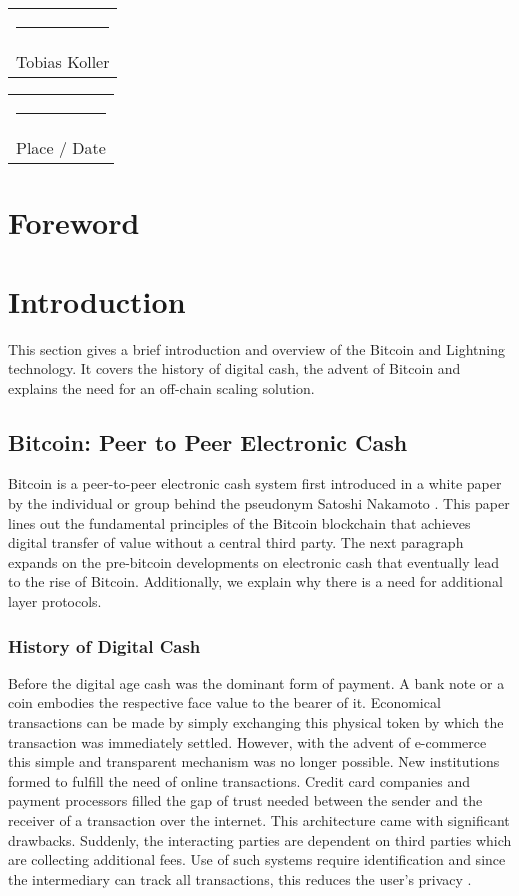 \documentclass[final]{fhnwreport}       %
\begin{document}
\vspace*{4em}\noindent
\hfill%
\begin{tabular}[t]{c}
  \rule{10em}{0.4pt}\\Tobias Koller 
\end{tabular}%
\hfill%
\begin{tabular}[t]{c}
  \rule{10em}{0.4pt}\\ Place / Date
\end{tabular}%
\hfill\strut
\clearpage

\section*{Foreword}
\clearpage

\clearpage


\section{Introduction} 
This section gives a brief introduction and overview of the Bitcoin and Lightning technology. It covers the history of digital cash, the advent of Bitcoin and explains the need for an off-chain scaling solution. 

\subsection{Bitcoin: Peer to Peer Electronic Cash}\label{subsec:peertopeer}
Bitcoin is a peer-to-peer electronic cash system first introduced in a white paper by the individual or group behind the pseudonym Satoshi Nakamoto \citep{nakamoto_bitcoin_2008}. This paper lines out the fundamental principles of the Bitcoin \gls{blockchain} that achieves digital transfer of value without a central third party. The next paragraph expands on the pre-bitcoin developments on electronic cash that eventually lead to the rise of Bitcoin. Additionally, we explain why there is a need for additional layer protocols.

\subsubsection{History of Digital Cash}
Before the digital age cash was the dominant form of payment. A bank note or a coin embodies the respective face value to the bearer of it. Economical transactions can be made by simply exchanging this physical token by which the transaction was immediately settled. However, with the advent of e-commerce this simple and transparent mechanism was no longer possible. New institutions formed to fulfill the need of online transactions. Credit card companies and payment processors filled the gap of trust needed between the sender and the receiver of a transaction over the internet. This architecture came with significant drawbacks. Suddenly, the interacting parties are dependent on third parties which are collecting additional fees. Use of such systems require identification and since the intermediary can track all transactions, this reduces the user's privacy \citep{narayanan_bitcoin_2016}.
\end{document}
